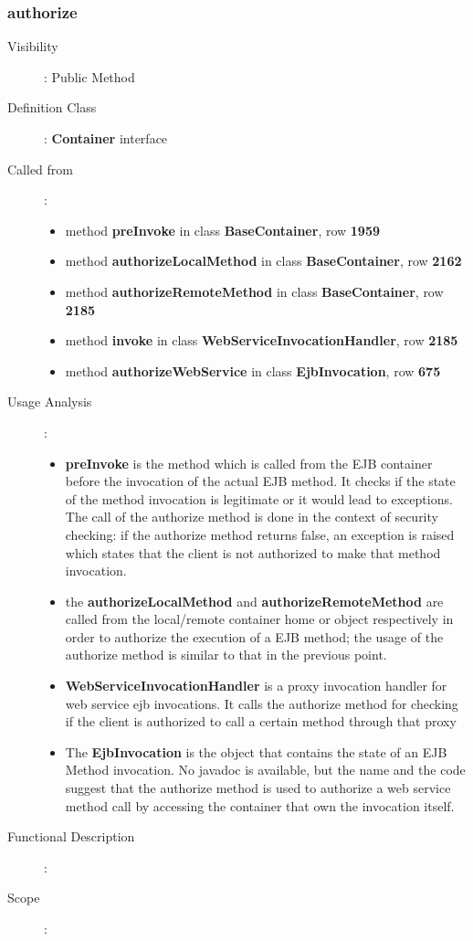 \documentclass[11pt, a4paper,titlepage]{article}
\begin{document}
	 \subsubsection{authorize}
		 \begin{description}
		 	\item[Visibility]: Public Method
		 	\item[Definition Class]: \textbf{Container} interface
		 	\item[Called from]: 
		 	\begin{itemize}
		 		\item method \textbf{preInvoke} in class \textbf{BaseContainer}, row \textbf{1959}
		 		\item method \textbf{authorizeLocalMethod} in class \textbf{BaseContainer}, row \textbf{2162}
		 		\item method \textbf{authorizeRemoteMethod} in class \textbf{BaseContainer}, row \textbf{2185}
		 		\item method \textbf{invoke} in class \textbf{WebServiceInvocationHandler}, row \textbf{2185} 
		 		\item method \textbf{authorizeWebService} in class \textbf{EjbInvocation}, row \textbf{675}
		 	\end{itemize}
		 	\item[Usage Analysis]: 
		 	\begin{itemize}
		 		\item \textbf{preInvoke} is the method which is called from the EJB container before the invocation of the actual EJB method. It checks if the state of the method invocation is legitimate or it would lead to exceptions. \newline
		 		The call of the authorize method is done in the context of security checking: if the authorize method returns false, an exception is raised which states that the client is not authorized to make that method invocation. 
		 		\item the \textbf{authorizeLocalMethod} and \textbf{authorizeRemoteMethod} are called from the local/remote container home or object respectively in order to authorize the execution of a EJB method; the usage of the authorize method is similar to that in the previous point.
		 		\item \textbf{WebServiceInvocationHandler} is a proxy invocation handler for web service ejb invocations.\newline
		 		It calls the authorize method for checking if the client is authorized to call a certain method through that proxy
		 		\item The \textbf{EjbInvocation} is the object that contains the state of an EJB Method invocation. No javadoc is available, but the name and the code suggest that the authorize method is used to authorize a web service method call by accessing the container that own the invocation itself. 
		 	\end{itemize} 
		 	\item[Functional Description]:
		 	\item[Scope]: 
		 \end{description}
		 
\end{document}
